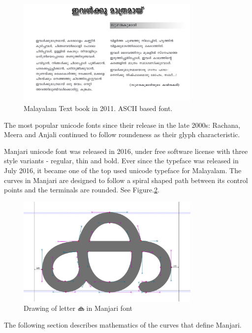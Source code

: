 \documentclass[10pt]{article}
\begin{document}
\begin{figure}
	\centering
	\includegraphics[width=0.8\textwidth]{images/2011-Malayalam-Textbook.png}
	\caption{Malayalam Text book in 2011. ASCII based font.}
	\label{maltextbook}
\end{figure}

 
 The most popular unicode fonts since their release in the late 2000s:  Rachana, Meera and Anjali continued to follow roundeness as their glyph characteristic. 

 
 Manjari unicode font was released in 2016,  under free software license with three style variants - regular, thin and bold. Ever since the typeface was released in July 2016, it became one of the top used unicode typeface for Malayalam. The curves in Manjari are designed to follow a spiral shaped path between its control points and the terminals are rounded. See Figure.\ref{manjari-ka}.
\begin{figure}
	\centering
	\includegraphics[width=0.8\textwidth]{images/Manjari-Ka.png}
	\caption{Drawing of letter {\manjari ക} in Manjari font}
	\label{manjari-ka}
\end{figure} 
 
 The following section describes mathematics of the curves that define Manjari. 
 
\end{document}
